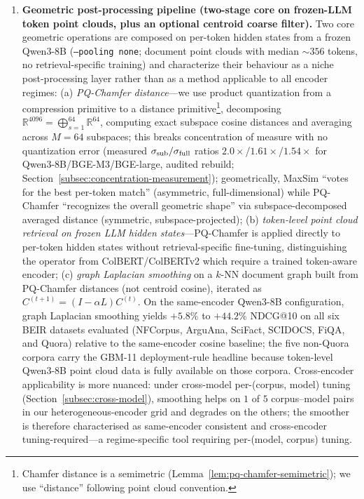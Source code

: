 \documentclass[review,1p]{elsarticle}
\newcommand{\R}{\mathbb{R}}
\begin{document}
\begin{enumerate}[leftmargin=*]
\item \textbf{Geometric post-processing pipeline (two-stage core on frozen-LLM token point clouds, plus an optional centroid coarse filter).} Two core geometric operations are composed on per-token hidden states from a frozen Qwen3-8B (\texttt{--pooling none}; document point clouds with median ${\sim}356$ tokens, no retrieval-specific training) and characterize their behaviour as a niche post-processing layer rather than as a method applicable to all encoder regimes: (a) \emph{PQ-Chamfer distance}---we use product quantization \citep{jegou2011pq} from a compression primitive to a distance primitive\footnote{Chamfer distance is a semimetric (Lemma~\ref{lem:pq-chamfer-semimetric}); we use ``distance'' following point cloud convention.}, decomposing $\R^{4096} = \bigoplus_{s=1}^{64} \R^{64}$, computing exact subspace cosine distances and averaging across $M=64$ subspaces; this breaks concentration of measure with no quantization error (measured $\sigma_{\rm sub}/\sigma_{\rm full}$ ratios $2.0\times$/$1.61\times$/$1.54\times$ for Qwen3-8B/BGE-M3/BGE-large, audited rebuild; Section~\ref{subsec:concentration-measurement}); geometrically, MaxSim ``votes for the best per-token match'' (asymmetric, full-dimensional) while PQ-Chamfer ``recognizes the overall geometric shape'' via subspace-decomposed averaged distance (symmetric, subspace-projected); (b) \emph{token-level point cloud retrieval on frozen LLM hidden states}---PQ-Chamfer is applied directly to per-token hidden states without retrieval-specific fine-tuning, distinguishing the operator from ColBERT/ColBERTv2 \citep{khattab2020colbert,santhanam2022colbertv2} which require a trained token-aware encoder; (c) \emph{graph Laplacian smoothing} on a $k$-NN document graph built from PQ-Chamfer distances (not centroid cosine), iterated as $C^{(t+1)} = (I - \alpha L) C^{(t)}$. On the same-encoder Qwen3-8B configuration, graph Laplacian smoothing yields $+5.8\%$ to $+44.2\%$ NDCG@10 on all six BEIR datasets evaluated (NFCorpus, ArguAna, SciFact, SCIDOCS, FiQA, and Quora) relative to the same-encoder cosine baseline; the five non-Quora corpora carry the GBM-11 deployment-rule headline because token-level Qwen3-8B point cloud data is fully available on those corpora. Cross-encoder applicability is more nuanced: under cross-model per-(corpus, model) tuning (Section~\ref{subsec:cross-model}), smoothing helps on $1$ of $5$ corpus--model pairs in our heterogeneous-encoder grid and degrades on the others; the smoother is therefore characterised as same-encoder consistent and cross-encoder tuning-required---a regime-specific tool requiring per-(model, corpus) tuning.


\end{enumerate}
\end{document}
